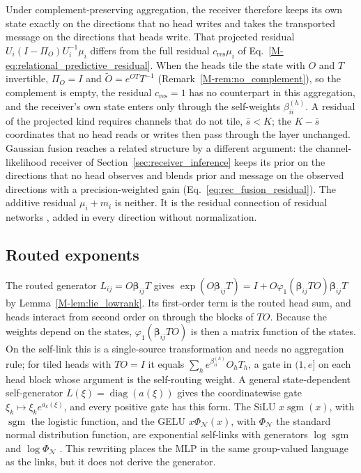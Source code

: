 \documentclass[twoside,11pt]{article}
\begin{document}
Under complement-preserving aggregation, the receiver therefore keeps its own state exactly on the directions that no head writes and takes the transported message on the directions that heads write. That projected residual $U_i(I-\Pi_O)U_i^{-1}\mu_i$ differs from the full residual $c_{\mathrm{res}}\mu_i$ of Eq.~\eqref{M-eq:relational_predictive_residual}. When the heads tile the state with $O$ and $T$ invertible, $\Pi_O=I$ and $\widetilde O=e^{OT}T^{-1}$ (Remark~\ref{M-rem:no_complement}), so the complement is empty, the residual $c_{\mathrm{res}}=1$ has no counterpart in this aggregation, and the receiver's own state enters only through the self-weights $\beta_{ii}^{(h)}$. A residual of the projected kind requires channels that do not tile, $\bar s<K$; the $K-\bar s$ coordinates that no head reads or writes then pass through the layer unchanged. Gaussian fusion reaches a related structure by a different argument: the channel-likelihood receiver of Section~\ref{sec:receiver_inference} keeps its prior on the directions that no head observes and blends prior and message on the observed directions with a precision-weighted gain (Eq.~\eqref{eq:rec_fusion_residual}). The additive residual $\mu_i+m_i$ is neither. It is the residual connection of residual networks \citep{He2016ResNet}, added in every direction without normalization.

\subsection{Routed exponents}
\label{supp:routed_exponent}

\begin{remark}
\label{rem:lie_routed_exponent}
The routed generator $L_{ij}=O\boldsymbol\beta_{ij}T$ gives $\exp(O\boldsymbol\beta_{ij}T)=I+O\varphi_1(\boldsymbol\beta_{ij}TO)\boldsymbol\beta_{ij}T$ by Lemma~\ref{M-lem:lie_lowrank}. Its first-order term is the routed head sum, and heads interact from second order on through the blocks of $TO$. Because the weights depend on the states, $\varphi_1(\boldsymbol\beta_{ij}TO)$ is then a matrix function of the states. On the self-link this is a single-source transformation and needs no aggregation rule; for tiled heads with $TO=I$ it equals $\sum_he^{\beta_{ii}^{(h)}}O_hT_h$, a gate in $(1,e]$ on each head block whose argument is the self-routing weight. A general state-dependent self-generator $L(\xi)=\operatorname{diag}(a(\xi))$ gives the coordinatewise gate $\xi_k\mapsto\xi_ke^{a_k(\xi)}$, and every positive gate has this form. The SiLU $x\operatorname{sgm}(x)$, with $\operatorname{sgm}$ the logistic function, and the GELU $x\Phi_{\mathcal N}(x)$, with $\Phi_{\mathcal N}$ the standard normal distribution function, are exponential self-links with generators $\log\operatorname{sgm}$ and $\log\Phi_{\mathcal N}$ \citep{hendrycks2016gaussian}. This rewriting places the MLP in the same group-valued language as the links, but it does not derive the generator.
\end{remark}
\end{document}
